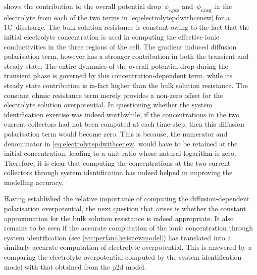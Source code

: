  shows the  contribution to the overall
potential drop~$\phi_\text{e,pos}$ and~$\phi_\text{e,neg}$ in  the electrolyte
from  each  of  the  two  terms  in \cref{eq:electrolytepdwithcenew}  for  a  1C~discharge. The bulk  solution resistance is constant owing to  the fact that the
initial  electrolyte concentration  is  used in  computing  the effective  ionic
conductivities in the three regions of  the cell. The gradient induced diffusion
polarisation term, however has a stronger contribution in both the transient and
steady  state. The  entire dynamics  of the  overall potential  drop during  the
transient  phase is  governed by  this concentration-dependent  term, while  its
steady state contribution  is in-fact higher than the  bulk solution resistance.
The  constant  ohmic resistance  term  merely  provides  a non-zero  offset  for
the  electrolyte  solution  overpotential.  In questioning  whether  the  system
identification exercise was indeed worthwhile,  if the concentrations in the two
current collectors had not been computed  at each time-step, then this diffusion
polarisation  term  would  become  zero.  This is  because,  the  numerator  and
denominator in \cref{eq:electrolytepdwithcenew} would have to be retained at the
initial concentration, leading to a unit  ratio whose natural logarithm is zero.
Therefore, it  is clear  that computing  the concentrations  at the  two current
collectors  through system  identification has  indeed helped  in improving  the
modelling accuracy.

Having established the relative  importance of computing the diffusion-dependent
polarisation   overpotential,  the   next  question   that  arises   is  whether
the   constant    approximation   for   the   bulk    solution   resistance   is
indeed   appropriate.   It  also   remains   to   be   seen  if   the   accurate
computation   of  the   ionic   concentration   through  system   identification
(see \cref{sec:perfanalysisnewmodel}) has  translated into a  similarly accurate
computation of  electrolyte overpotential. This  is answered by a  comparing the
electrolyte overpotential computed by the  system identification model with that
obtained from the \gls{p2d} model.

